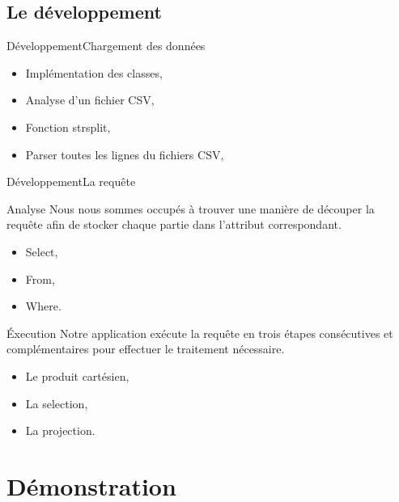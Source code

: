 \documentclass[10pt,handout]{beamer}
\begin{document}
\subsection{Le développement}

\begin{frame}{Développement}{Chargement des données}
  \begin{itemize}
    \item Implémentation des classes,
    \item Analyse d'un fichier CSV,
    \item Fonction strsplit,
    \item Parser toutes les lignes du fichiers CSV,
  \end{itemize}
\end{frame}

\begin{frame}{Développement}{La requête}
  \begin{block}{Analyse}
    Nous nous sommes occupés à trouver une manière de découper la requête afin de stocker chaque partie dans l’attribut correspondant.
    \begin{itemize}
      \item Select,
      \item From,
      \item Where.
    \end{itemize}
  \end{block}

  \begin{block}{Éxecution}
    Notre application exécute la requête en trois étapes consécutives et complémentaires pour effectuer le traitement nécessaire.
    \begin{itemize}
      \item Le produit cartésien,
      \item La selection,
      \item La projection.
    \end{itemize}
  \end{block}
\end{frame}


\section{Démonstration}

\end{document}
